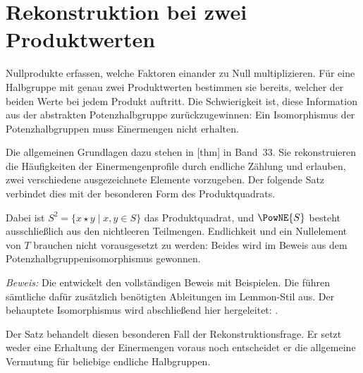 \section{Rekonstruktion bei zwei Produktwerten}
\hypertarget{nullproducts.main}{}

Nullprodukte erfassen, welche Faktoren einander zu Null multiplizieren.
Für eine Halbgruppe mit genau zwei Produktwerten bestimmen sie bereits,
welcher der beiden Werte bei jedem Produkt auftritt. Die Schwierigkeit ist,
diese Information aus der abstrakten Potenzhalbgruppe zurückzugewinnen:
Ein Isomorphismus der Potenzhalbgruppen muss Einermengen nicht erhalten.

Die allgemeinen Grundlagen dazu stehen in
[thm] in Band~33.
Sie rekonstruieren die Häufigkeiten der Einermengenprofile durch endliche
Zählung und erlauben, zwei verschiedene ausgezeichnete Elemente
vorzugeben. Der folgende Satz verbindet dies mit der besonderen Form des
Produktquadrats.


Dabei ist \(S^2=\{x\star y\mid x,y\in S\}\) das Produktquadrat,
und \(\PowNE{S}\) besteht ausschließlich aus den nichtleeren Teilmengen.
Endlichkeit und ein Nullelement von \(T\) brauchen nicht vorausgesetzt
zu werden: Beides wird im Beweis aus dem Potenzhalbgruppenisomorphismus
gewonnen.

\noindent\emph{Beweis:} Die \NullproductsReadingLink{} entwickelt den
vollständigen Beweis mit Beispielen. Die \NullproductsProofsLink{}
führen sämtliche dafür zusätzlich benötigten Ableitungen im
Lemmon-Stil aus. Der behauptete Isomorphismus wird abschließend hier
hergeleitet: .

Der Satz behandelt diesen besonderen Fall der Rekonstruktionsfrage.
Er setzt weder eine Erhaltung der Einermengen voraus noch entscheidet er
die allgemeine Vermutung für beliebige endliche Halbgruppen.
